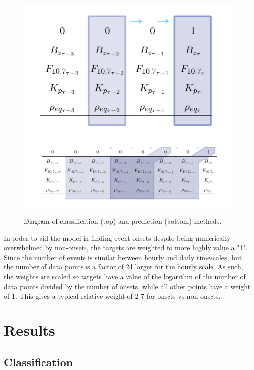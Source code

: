 \begin{figure}[htp!]
	\centering
	\includegraphics[width=0.6\linewidth]{Figures/CH5/ClassifyGraphic.png}
	\includegraphics[width=1\linewidth]{Figures/CH5/FullGraphic.png}
	\caption{Diagram of classification (top) and prediction (bottom) methods.}
	\label{fig:ClassifyDiagram}
\end{figure}


In order to aid the model in finding event onsets despite being numerically overwhelmed by non-onsets, the targets are weighted to more highly value a "1". Since the number of events is similar between hourly and daily timescales, but the number of data points is a factor of 24 larger for the hourly scale. As such, the weights are scaled so targets have a value of the logarithm of the number of data points divided by the number of onsets, while all other points have a weight of 1. This gives a typical relative weight of 2-7 for onsets vs non-onsets. 


\section{Results}

\subsection{Classification}

